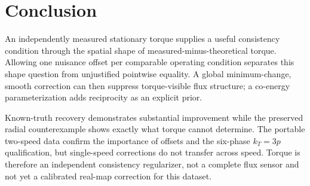 \section{Conclusion}
An independently measured stationary torque supplies a useful consistency
condition through the spatial shape of measured-minus-theoretical torque.
Allowing one nuisance offset per comparable operating condition separates this
shape question from unjustified pointwise equality. A global minimum-change,
smooth correction can then suppress torque-visible flux structure; a co-energy
parameterization adds reciprocity as an explicit prior.

Known-truth recovery demonstrates substantial improvement while the preserved
radial counterexample shows exactly what torque cannot determine. The portable
two-speed data confirm the importance of offsets and the six-phase $k_T=3p$
qualification, but single-speed corrections do not transfer across speed.
Torque is therefore an independent consistency regularizer, not a complete
flux sensor and not yet a calibrated real-map correction for this dataset.
